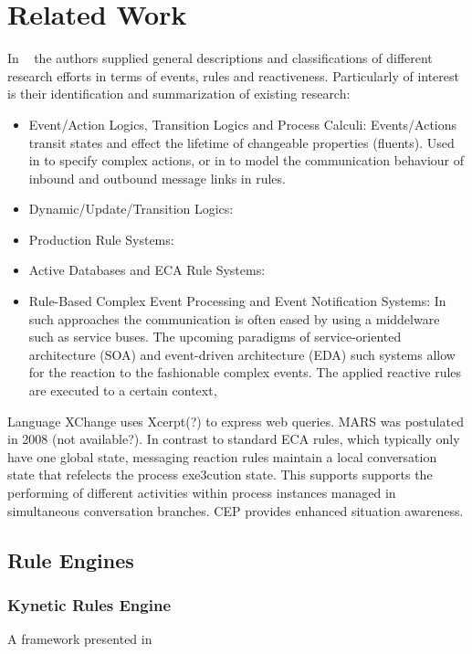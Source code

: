 \documentclass[11pt]{article}%
\begin{document}
\section{Related Work}
In ~\cite{2009-Paschke_Boley-RCER.pdf} the authors supplied general descriptions and classifications of different research efforts in terms of events, rules and reactiveness. Particularly of interest is their identification and summarization of existing research:
 \begin{itemize}
  \item Event/Action Logics, Transition Logics and Process Calculi: Events/Actions transit states and effect the lifetime of changeable properties (fluents). Used in \cite{Behrends:2008:EEA:1377798.1377801} to specify complex actions, or in to model the communication behaviour of inbound and outbound message links in rules.
  \item Dynamic/Update/Transition Logics: 
  \item Production Rule Systems:
  \item Active Databases and ECA Rule Systems:
  \item Rule-Based Complex Event Processing and Event Notification Systems: In such approaches the communication is often eased by using a middelware such as service buses. The upcoming paradigms of service-oriented architecture (SOA) and event-driven architecture (EDA) such systems allow for the reaction to the fashionable complex events. The applied reactive rules are executed to a certain context,

\end{itemize}
Language XChange uses Xcerpt(?) to express web queries. MARS was postulated in 2008 (not available?).
In contrast to standard ECA rules, which typically only have one global state, messaging reaction rules maintain a local conversation state that refelects the process exe3cution state. This supports supports the performing of different activities within process instances managed in simultaneous conversation branches.
CEP  provides enhanced situation awareness.

\subsection{Rule Engines}

\subsubsection{Kynetic Rules Engine}
A framework presented in ~\cite{bookTheLiveWeb}
\end{document}

